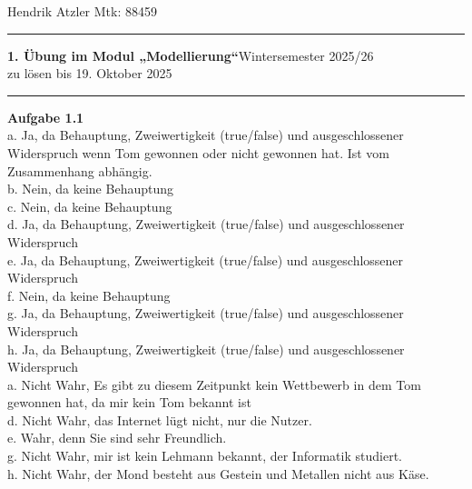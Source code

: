 \documentclass[a4paper,12pt]{article}
\begin{document}
Hendrik Atzler \hfill Mtk: 88459

\rule{\textwidth}{0.4pt}


{\textbf{1. Übung im Modul „Modellierung“}\hfill Wintersemester 2025/26} \\
zu lösen bis 19. Oktober 2025 \\
\rule{\textwidth}{0.4pt}

{\large{\textbf{Aufgabe 1.1}}} \\

a. Ja, da Behauptung, Zweiwertigkeit (true/false) und ausgeschlossener Widerspruch wenn Tom gewonnen oder nicht gewonnen hat. Ist vom Zusammenhang abhängig. \\
b. Nein, da keine Behauptung \\
c. Nein, da keine Behauptung \\
d. Ja, da Behauptung, Zweiwertigkeit (true/false) und ausgeschlossener Widerspruch \\
e. Ja, da Behauptung, Zweiwertigkeit (true/false) und ausgeschlossener Widerspruch \\
f. Nein, da keine Behauptung \\
g. Ja, da Behauptung, Zweiwertigkeit (true/false) und ausgeschlossener Widerspruch \\
h. Ja, da Behauptung, Zweiwertigkeit (true/false) und ausgeschlossener Widerspruch \\


a. Nicht Wahr, Es gibt zu diesem Zeitpunkt kein Wettbewerb in dem Tom gewonnen hat, da mir kein Tom bekannt ist \\
d. Nicht Wahr, das Internet lügt nicht, nur die Nutzer. \\
e. Wahr, denn Sie sind sehr Freundlich. \\
g. Nicht Wahr, mir ist kein Lehmann bekannt, der Informatik studiert. \\
h. Nicht Wahr, der Mond besteht aus Gestein und Metallen nicht aus Käse. \\
\end{document}
